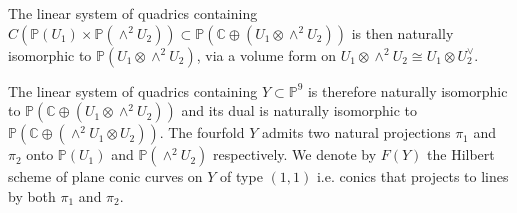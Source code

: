 \documentclass[a4paper,11pt]{amsart}
\theoremstyle{definition}
\numberwithin{equation}{section}
\numberwithin{equation}{section} \theoremstyle{definition}
\begin{document}
 The linear system of quadrics containing $C({{\mathbb{P}}}(U_1)\times {{\mathbb{P}}}(\wedge^2 U_2))\subset {{\mathbb{P}}}({{\mathbb{C}  }}\oplus (U_1\otimes \wedge^2 U_2))$ is then naturally isomorphic to ${{\mathbb{P}}}(U_1 \otimes \wedge^2 U_2)$, via a volume form on $ U_1\otimes \wedge^2 U_2\cong U_1\otimes  U_2 ^\vee$.
 
The linear system of quadrics containing $Y\subset {{\mathbb{P}}}^9$ is therefore naturally isomorphic to ${{\mathbb{P}}}({{\mathbb{C}  }}\oplus (U_1 \otimes \wedge^2 U_2))$ and its dual is naturally isomorphic to ${{\mathbb{P}}}({{\mathbb{C}  }}\oplus (\wedge^2 U_1 \otimes U_2))$. 
The fourfold $Y$ admits  two natural projections $\pi_1$ and $\pi_2$ onto  ${{\mathbb{P}}}(U_1)$ and ${{\mathbb{P}}}(\wedge^2 U_2)$ respectively.
We denote by $F(Y)$ the Hilbert scheme of plane conic curves on $Y$ of type $(1,1)$ i.e. conics that projects to lines by both $\pi_1$ and $\pi_2$. 
\end{document}
